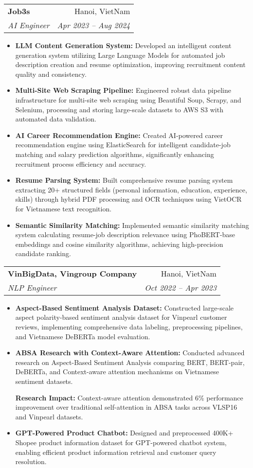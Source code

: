 \documentclass[letterpaper,11pt]{article}
\makeatletter
\newcommand{\resumeItem}[1]{
  \item\small{
    {#1 \vspace{-2pt}}
  }
}
\newcommand{\resumeSubheading}[4]{
  \vspace{-2pt}\item
    \begin{tabular*}{1.0\textwidth}[t]{l@{\extracolsep{\fill}}r}
      \textbf{#1} & \small #2 \\
      \textit{\small#3} & \textit{\small #4} \\
      
    \end{tabular*}\vspace{-7pt}
}
\newcommand{\resumeItemListStart}{\justify \begin{itemize}}
\newcommand{\resumeItemListEnd}{\end{itemize}\vspace{-2pt}}
\makeatother
\begin{document}
    \resumeSubheading
      {Job3s}{Hanoi, VietNam}
      {AI Engineer}{ Apr 2023 -- Aug 2024}
      \vspace{-7pt}
      \resumeItemListStart
        \resumeItem{\textbf{LLM Content Generation System:} Developed an intelligent content generation system utilizing Large Language Models for automated job description creation and resume optimization, improving recruitment content quality and consistency.}
        \resumeItem{\textbf{Multi-Site Web Scraping Pipeline:} Engineered robust data pipeline infrastructure for multi-site web scraping using Beautiful Soup, Scrapy, and Selenium, processing and storing large-scale datasets to AWS S3 with automated data validation.}
        \resumeItem{\textbf{AI Career Recommendation Engine:} Created AI-powered career recommendation engine using ElasticSearch for intelligent candidate-job matching and salary prediction algorithms, significantly enhancing recruitment process efficiency and accuracy.}
        \resumeItem{\textbf{Resume Parsing System:} Built comprehensive resume parsing system extracting 20+ structured fields (personal information, education, experience, skills) through hybrid PDF processing and OCR techniques using VietOCR for Vietnamese text recognition.}
        \resumeItem{\textbf{Semantic Similarity Matching:} Implemented semantic similarity matching system calculating resume-job description relevance using PhoBERT-base embeddings and cosine similarity algorithms, achieving high-precision candidate ranking.}
     \resumeItemListEnd
     
    \resumeSubheading
      {VinBigData, Vingroup Company}{Hanoi, VietNam}
      {NLP Engineer}{ Oct 2022 -- Apr 2023}
      \vspace{-7pt}
      \resumeItemListStart
        \resumeItem{\textbf{Aspect-Based Sentiment Analysis Dataset:} Constructed large-scale aspect polarity-based sentiment analysis dataset for Vinpearl customer reviews, implementing comprehensive data labeling, preprocessing pipelines, and Vietnamese DeBERTa model evaluation.}
        \resumeItem{\textbf{ABSA Research with Context-Aware Attention:} Conducted advanced research on Aspect-Based Sentiment Analysis comparing BERT, BERT-pair, DeBERTa, and Context-aware attention mechanisms on Vietnamese sentiment datasets.
        \vspace{-4pt}
            \resumeItemListStart{\textbf{Research Impact:} Context-aware attention demonstrated 6\% performance improvement over traditional self-attention in ABSA tasks across VLSP16 and Vinpearl datasets.}
            \resumeItemListEnd
        }
        \resumeItem{\textbf{GPT-Powered Product Chatbot:} Designed and preprocessed 400K+ Shopee product information dataset for GPT-powered chatbot system, enabling efficient product information retrieval and customer query resolution.}
     \resumeItemListEnd
     
\end{document}
